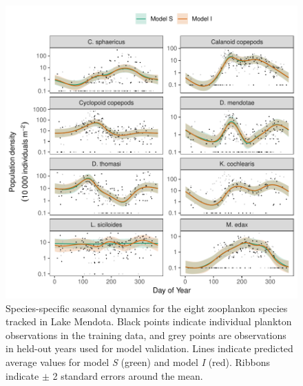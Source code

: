 \documentclass[12pt]{article}
\begin{document}
\begin{figure}
\centering
\includegraphics{../figures/Fig15.pdf}
\caption{\label{fig:Fig15}Species-specific seasonal dynamics for the
eight zooplankon species tracked in Lake Mendota. Black points indicate
individual plankton observations in the training data, and grey points
are observations in held-out years used for model validation. Lines
indicate predicted average values for model \emph{S} (green) and model
\emph{I} (red). Ribbons indicate \(\pm\) 2 standard errors around the
mean.}
\end{figure}
\end{document}
